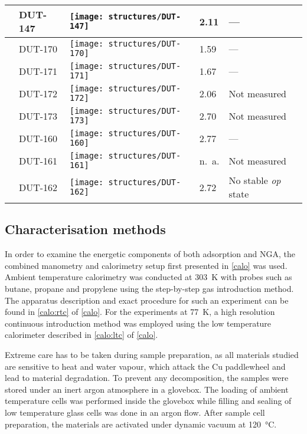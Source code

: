 \begin{table}[p]
\begin{tabularx}{\linewidth}{M{1cm} | Y >{\centering}m{5cm} Y p{2.5cm}}
        & DUT-147  & 
            \texttt{[image: structures/DUT-147]}
            & 2.11 & --- \\
        \midrule
         &
        DUT-170  & 
            \texttt{[image: structures/DUT-170]}
            & 1.59 & --- \\
        & DUT-171  & 
            \texttt{[image: structures/DUT-171]}
            & 1.67 & --- \\
        & DUT-172  & 
            \texttt{[image: structures/DUT-172]}
            & 2.06 & Not measured \\
        & DUT-173  & 
            \texttt{[image: structures/DUT-173]}
            & 2.70 & Not measured \\
        \midrule
         &
        DUT-160  & 
            \texttt{[image: structures/DUT-160]}
            & 2.77 & --- \\
        & DUT-161  & 
            \texttt{[image: structures/DUT-161]}
            & n.\ a. & Not measured \\
        & DUT-162  & 
            \texttt{[image: structures/DUT-162]}
            & 2.72 & No stable \textit{op} state \\
        \bottomrule
	\end{tabularx}%
	\label{dut:tbl:materials}
\end{table}%

\subsection{Characterisation methods}

In order to examine the energetic components of both adsorption and 
NGA, the combined manometry and calorimetry setup first 
presented in \autoref{calo} was used. Ambient temperature calorimetry
was conducted at \SI{303}{\kelvin} with probes such as butane, propane
and propylene using the step-by-step gas introduction method. 
The apparatus description and exact procedure for such an experiment 
can be found in \autoref{calo:rtc} of \autoref{calo}.
For the experiments at \SI{77}{\kelvin}, a high resolution continuous
introduction method was employed using the low temperature calorimeter
described in \autoref{calo:ltc} of \autoref{calo}.

Extreme care has to be taken during sample preparation, as all materials 
studied are sensitive to heat and water vapour, which attack
the Cu paddlewheel and lead to material degradation. To prevent any 
decomposition, the samples were stored under an inert argon 
atmosphere in a glovebox. The loading of ambient temperature 
cells was performed inside the glovebox while filling and sealing 
of low temperature glass cells was done in an argon flow. After 
sample cell preparation, the materials are activated under 
dynamic vacuum at \SI{120}{\degreeCelsius}. 

